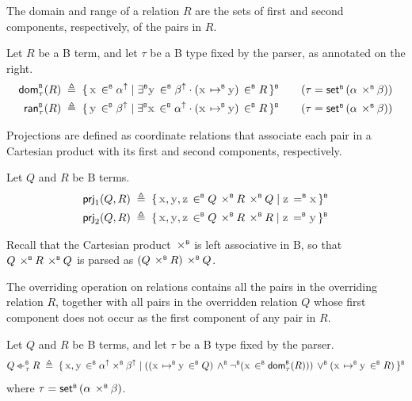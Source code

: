 The domain and range of a relation \(R\) are the sets of first and second
components, respectively, of the pairs in \(R\).
\begin{definition}
  \label{def:b-syntax-dom-ran}
      Let \(R\) be a B term, and let \(\tau\) be a B type fixed by the parser, as annotated on the right.
  \begin{align*}
    \domB[\tau](R) & \;\triangleq\; \bcomp{\var{x} \inB \lift{\alpha}}{\existsB \var{y} \inB \lift{\beta} \cdot (\var{x} \mapletB \var{y}) \inB R} \tag{\(\tau = \setB(\alpha \prodB \beta)\)} \\
    \ranB[\tau](R) & \;\triangleq\; \bcomp{\var{y} \inB \lift{\beta}}{\existsB \var{x} \inB \lift{\alpha} \cdot (\var{x} \mapletB \var{y}) \inB R} \tag{\(\tau = \setB(\alpha \prodB \beta)\)}
  \end{align*}
\end{definition}

Projections are defined as coordinate relations that associate each pair in a
Cartesian product with its first and second components, respectively.
\begin{definition}
  Let \(Q\) and \(R\) be B terms.
  \begin{align*}
    \mathsf{prj}_1(Q, R) & \;\triangleq\; \bcomp{\var{x}, \var{y}, \var{z} \inB Q \prodB R \prodB Q}{\var{z} \eqB \var{x}} \\
    \mathsf{prj}_2(Q, R) & \;\triangleq\; \bcomp{\var{x}, \var{y}, \var{z} \inB Q \prodB R \prodB R}{\var{z} \eqB \var{y}}
  \end{align*}
\end{definition}

\begin{note}
  Recall that the Cartesian product \(\mathbin{\,\times^{\scriptscriptstyle{\mathsf{B}}}}\) is left associative in B, so that
  \(Q \mathbin{\,\times^{\scriptscriptstyle{\mathsf{B}}}} R \mathbin{\,\times^{\scriptscriptstyle{\mathsf{B}}}} Q\) is parsed as \((Q \mathbin{\,\times^{\scriptscriptstyle{\mathsf{B}}}} R) \mathbin{\,\times^{\scriptscriptstyle{\mathsf{B}}}} Q\).
\end{note}

The overriding operation on relations contains all the pairs in the overriding
relation \(R\), together with all pairs in the overridden relation \(Q\) whose
first component does not occur as the first component of any pair in \(R\).

\begin{definition}
  Let \(Q\) and \(R\) be B terms, and let \(\tau\) be a B type fixed by the parser.
  \[
    Q \overloadB[\tau] R \;\triangleq\; \bcomp{\var{x}, \var{y} \inB \lift{\alpha}\! \prodB \lift{\beta}}{\left(\left(\var{x} \mapletB \var{y} \inB Q\right) \andB \notB(\var{x} \inB \domB[\tau](R))\right) \orB (\var{x} \mapletB \var{y} \inB R)}
  \]
  where \(\tau = \mathsf{set}^{\scriptscriptstyle{\mathsf{B}}}\,(\alpha \mathbin{\,\times^{\scriptscriptstyle{\mathsf{B}}}} \beta)\).
\end{definition}

